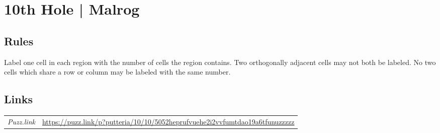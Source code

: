 \section{10th Hole | {\normalfont Malrog}}
\label{sec:05-10th-hole-malrog}

\subsection*{Rules}
\begin{markdown}
Label one cell in each region with the number of cells the region contains. Two orthogonally adjacent cells may not both be labeled. No two cells which share a row or column may be labeled with the same number.
\end{markdown}
\subsection*{Links}
\begin{tabularx}{\textwidth}{l X}
\emph{Puzz.link} & \url{https://puzz.link/p?putteria/10/10/5052heprufvuehe2i2vvfumtdao19a6tfunuzzzzz} \\
\end{tabularx}
\pagebreak
